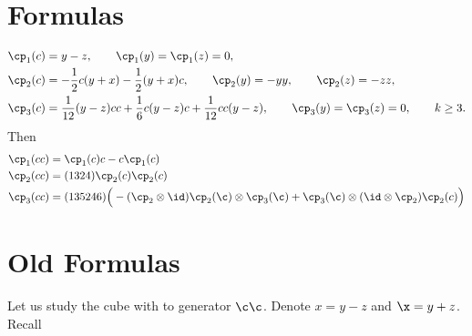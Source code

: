 
\newpage
\section{Formulas}

\begin{align*}
& \cp_1(c) = y-z, \qquad
\cp_1(y) = \cp_1(z) = 0, \\
& \cp_2(c) = - \frac{1}{2} c (y+x) - \frac{1}{2} (y+x) c, \qquad
\cp_2(y) = - y y, \qquad
\cp_2(z) = - z z, \\
& \cp_3(c) = \frac{1}{12} (y-z) c c + \frac{1}{6} c (y-z) c + \frac{1}{12} c c (y-z), \qquad
\cp_3(y) = \cp_3(z) = 0, \qquad k \geq 3.
\end{align*}
Then
\begin{align*}
\cp_1(cc) &= \cp_1(c)c - c\cp_1(c) \\
\cp_2(cc) &= (1324) \cp_2(c)\cp_2(c) \\
\cp_3(cc) &= (135246) \Big( - (\cp_2 \otimes \id) \cp_2(\c) \otimes \cp_3(\c) + \cp_3(\c) \otimes (\id \otimes \cp_2) \cp_2(c) \Big) \\
\end{align*}

\newpage

\section{Old Formulas}

Let us study the cube with to generator $\c\c$.
Denote $x = y-z$ and $\x = y+z$.
Recall

